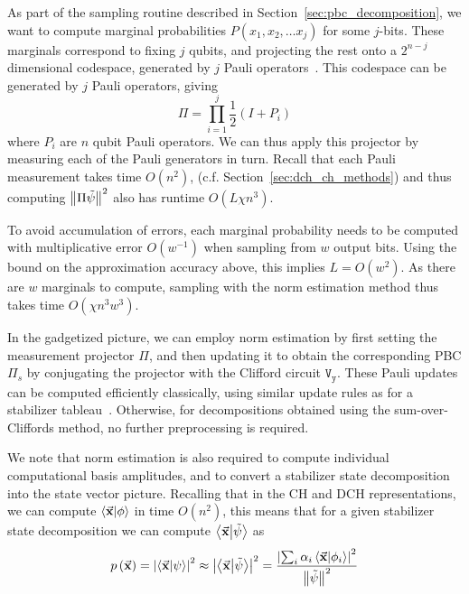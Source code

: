 As part of the sampling routine described in Section~\ref{sec:pbc_decomposition}, we want to compute marginal probabilities $P\left(x_{1},x_{2},\dots x_{j}\right)$ for some $j$-bits. These marginals correspond to fixing $j$ qubits, and projecting the rest onto a $2^{n-j}$ dimensional codespace, generated by $j$ Pauli operators~\cite{Bravyi2016}. This codespace can be generated by $j$ Pauli operators, giving
\[\Pi = \prod_{i=1}^{j}\frac{1}{2}\left(I+P_{i}\right)\]
where $P_{i}$ are $n$ qubit Pauli operators. We can thus apply this projector by measuring each of the Pauli generators in turn. Recall that each Pauli measurement takes time $O(n^{2})$, (c.f. Section~\ref{sec:dch_ch_methods}) and thus computing $\norm{\Pi\tilde{\psi}}^{2}$ also has runtime $O\left(L\chi n^{3}\right)$.\par
To avoid accumulation of errors, each marginal probability needs to be computed with multiplicative error $O(w^{-1})$ when sampling from $w$ output bits. Using the bound on the approximation accuracy above, this implies $L=O(w^{2})$. As there are $w$ marginals to compute, sampling with the norm estimation method thus takes time $O(\chi n^{3}w^{3})$.\par
In the gadgetized picture, we can employ norm estimation by first setting the measurement projector $\Pi$, and then updating it to obtain the corresponding PBC $\Pi_{s}$ by conjugating the projector with the Clifford circuit $\mathtt{V_{y}}$. These Pauli updates can be computed efficiently classically, using similar update rules as for a stabilizer tableau~\cite{Aaronson2004}. Otherwise, for decompositions obtained using the sum-over-Cliffords method, no further preprocessing is required.\par
We note that norm estimation is also required to compute individual computational basis amplitudes, and to convert a stabilizer state decomposition into the state vector picture. Recalling that in the CH and DCH representations, we can compute $\braket{\va{x}}{\phi}$ in time $O(n^{2})$, this means that for a given stabilizer state decomposition we can compute $\braket{\va{x}}{\tilde{\psi}}$ as
\begin{equation}
    p\left(\va{x}\right) = \left|\braket{\va{x}}{\psi}\right|^{2}\approx \left|\braket{\va{x}}{\tilde{\psi}}\right|^{2} = \frac{\left|\sum_{i}\alpha_{i}\braket{\va{x}}{\phi_{i}}\right|^{2}}{\norm{\tilde{\psi}}^{2}}\label{eq:decomp_amplitude}
\end{equation}

